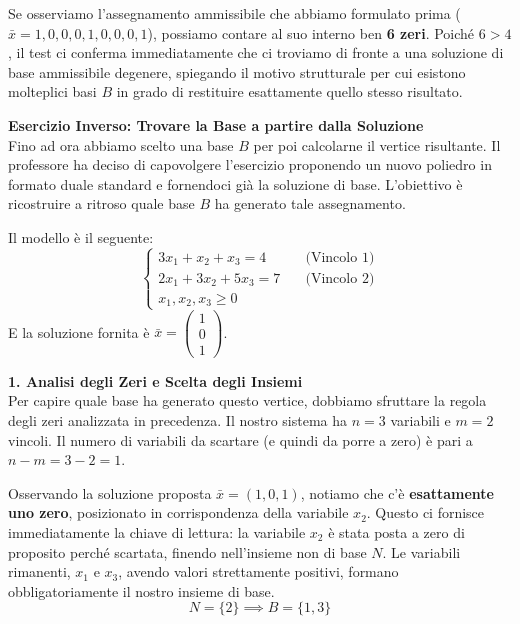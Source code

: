\documentclass[12pt, a4paper]{article}
\begin{document}
	Se osserviamo l'assegnamento ammissibile che abbiamo formulato prima ($\bar{x} = 1,0,0,0,1,0,0,0,1$), possiamo contare al suo interno ben \textbf{6 zeri}. Poiché $6 > 4$, il test ci conferma immediatamente che ci troviamo di fronte a una soluzione di base ammissibile degenere, spiegando il motivo strutturale per cui esistono molteplici basi $B$ in grado di restituire esattamente quello stesso risultato.
	
	\vspace{0.6cm}
	\textbf{Esercizio Inverso: Trovare la Base a partire dalla Soluzione}\\
	Fino ad ora abbiamo scelto una base $B$ per poi calcolarne il vertice risultante. Il professore ha deciso di capovolgere l'esercizio proponendo un nuovo poliedro in formato duale standard e fornendoci già la soluzione di base. L'obiettivo è ricostruire a ritroso quale base $B$ ha generato tale assegnamento.
	
	Il modello è il seguente:
	\[
	\begin{cases}
		3x_1 + x_2 + x_3 = 4 \quad &\text{(Vincolo 1)} \\
		2x_1 + 3x_2 + 5x_3 = 7 \quad &\text{(Vincolo 2)} \\
		x_1, x_2, x_3 \geq 0
	\end{cases}
	\]
	E la soluzione fornita è $\bar{x} = \begin{pmatrix} 1 \\ 0 \\ 1 \end{pmatrix}$.
	
	\vspace{0.4cm}
	\textbf{1. Analisi degli Zeri e Scelta degli Insiemi}\\
	Per capire quale base ha generato questo vertice, dobbiamo sfruttare la regola degli zeri analizzata in precedenza. Il nostro sistema ha $n = 3$ variabili e $m = 2$ vincoli. Il numero di variabili da scartare (e quindi da porre a zero) è pari a $n - m = 3 - 2 = 1$.
	
	Osservando la soluzione proposta $\bar{x} = (1, 0, 1)$, notiamo che c'è \textbf{esattamente uno zero}, posizionato in corrispondenza della variabile $x_2$. 
	Questo ci fornisce immediatamente la chiave di lettura: la variabile $x_2$ è stata posta a zero di proposito perché scartata, finendo nell'insieme non di base $N$. Le variabili rimanenti, $x_1$ e $x_3$, avendo valori strettamente positivi, formano obbligatoriamente il nostro insieme di base.
	\[
	N = \{2\} \implies B = \{1, 3\}
	\]
	
\end{document}
